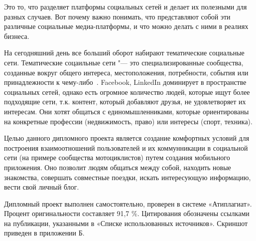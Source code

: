 Это то, что разделяет платформы социальных сетей и делает их
полезными для разных случаев. Вот почему важно понимать, что
представляют собой эти различные социальные медиа-платформы, и что
можно делать с ними в реалиях бизнеса. 

На сегодняшний день все больший оборот набирают тематические социальные сети. Тематические соцаильные сети "--- это специализированные сообщества, созданные вокруг общего интереса, местоположения, потребности, события или принадлежности к чему-либо~\cite{verticalSN}. 
Facebook, LinkedIn доминирует в пространстве социальных сетей, однако есть огромное количество людей, которые ищут более подходящие сети, т.к. контент, который добавляют друзья, не удовлетворяет их интересам.
Они хотят общаться с единомышленниками, которые ориентированы на конкретные профессии (недвижимость, право) или интересы (спорт, техника). 

Целью данного дипломного проекта является создание комфортных условий для построения взаимоотношений пользователей и их коммунникации в социальной сети (на примере сообщества мотоциклистов) путем создания мобильного приложения. 
Оно позволит людям общаться между собой, находить новые
знакомства, совершать совместные поездки, искать интересующую информацию, вести свой личный блог.

Дипломный проект выполнен самостоятельно, проверен в системе «Атиплагиат». Процент оригинальности составляет	91,7 \%. Цитирования обозначены ссылками на публикации, указанными в «Списке
использованных источников». Скриншот приведен в приложении Б.
